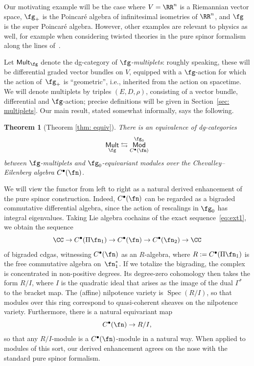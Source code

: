 \documentclass[10pt,a4paper]{amsart}
\numberwithin{equation}{section}
\newtheorem*{thm*}{Theorem}
\def\cat#1{\ensuremath{\mathsf{#1}}}
\DeclareMathOperator{\Mod}{\cat{Mod}}
\DeclareMathOperator{\Mult}{\cat{Mult}}
\def\bu{\bullet}
\DeclareMathOperator{\Spec}{Spec}
\begin{document}
Our motivating example will be
the case where $V=\RR^n$ is a Riemannian vector space, $\fg_+$ is the Poincar\'e algebra of infinitesimal isometries of $\RR^n$, and $\fg$ is the super Poincar\'e algebra. However, other examples are relevant to physics as well, for example when considering twisted theories in the pure spinor formalism along the lines of~\cite{spinortwist}.

Let $\Mult_{\fg}$ denote the dg-category of \emph{$\fg$-multiplets}: roughly speaking, these will be differential graded vector bundles on $V$, equipped with a $\fg$-action for which the action of~$\fg_+$ is ``geometric'', i.e., inherited from the action on spacetime. We will denote multiplets by triples $(E,D,\rho)$, consisting of a vector bundle, differential and $\fg$-action; precise definitions will be given in Section~\ref{sec: multiplets}. Our main result, stated somewhat informally, says the following.

\begin{thm*}[Theorem \ref{thm: equiv}]
	There is an equivalence of dg-categories
	\begin{equation}
	\label{informal_equivalence}
	\Mult_{\fg} \leftrightarrows \Mod_{C^\bullet(\fn)}^{\fg_0}
	\end{equation}
	between $\fg$-multiplets and $\fg_0$-equivariant modules over the Chevalley--Eilenberg algebra $C^\bullet(\fn)$.
\end{thm*}

We will view the functor from left to right as a natural derived enhancement of the pure spinor construction. Indeed, $C^\bullet(\fn)$ can be regarded as a bigraded commutative differential algebra, since the action of rescalings in $\fg_0$ has integral eigenvalues.
Taking Lie algebra cochains of the exact sequence~\eqref{eq:ext1}, we obtain the sequence
\begin{equation*}
	\CC \to C^\bu(\Pi \fn_1) \to C^\bu(\fn) \to C^\bu(\fn_2) \to \CC
\end{equation*}
of bigraded cdgas, witnessing $C^\bu(\fn)$ as an $R$-algebra, where $R := C^\bu(\Pi \fn_1)$ is the free commutative algebra on~$\fn_1^*$.
If we totalize the bigrading, the complex is concentrated in non-positive degrees. Its degree-zero cohomology then takes the form $R/I$, where $I$ is the quadratic ideal that arises as the image of the dual $\Gamma^*$ to the bracket map. The (affine) nilpotence variety is $\Spec(R/I)$, so that modules over this ring correspond to quasi-coherent sheaves on the nilpotence variety. Furthermore, there is a natural equivariant map
\begin{equation*}
	C^\bu(\fn) \to R/I,
\end{equation*}
so that any $R/I$-module is a $C^\bu(\fn)$-module in a natural way. When applied to modules of this sort, our derived enhancement agrees on the nose with the standard pure spinor formalism.
\end{document}
